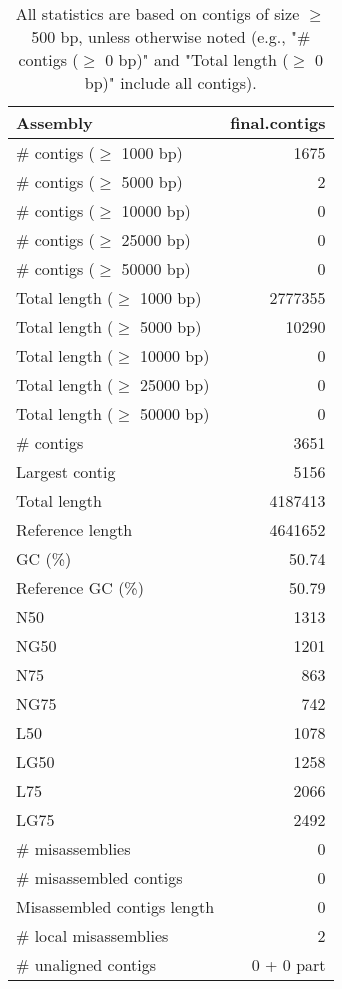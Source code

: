 \documentclass[12pt,a4paper]{article}
\begin{document}
\begin{table}[ht]
\begin{center}
\caption{All statistics are based on contigs of size $\geq$ 500 bp, unless otherwise noted (e.g., "\# contigs ($\geq$ 0 bp)" and "Total length ($\geq$ 0 bp)" include all contigs).}
\begin{tabular}{|l*{1}{|r}|}
\hline
Assembly & final.contigs \\ \hline
\# contigs ($\geq$ 1000 bp) & 1675 \\ \hline
\# contigs ($\geq$ 5000 bp) & 2 \\ \hline
\# contigs ($\geq$ 10000 bp) & 0 \\ \hline
\# contigs ($\geq$ 25000 bp) & 0 \\ \hline
\# contigs ($\geq$ 50000 bp) & 0 \\ \hline
Total length ($\geq$ 1000 bp) & 2777355 \\ \hline
Total length ($\geq$ 5000 bp) & 10290 \\ \hline
Total length ($\geq$ 10000 bp) & 0 \\ \hline
Total length ($\geq$ 25000 bp) & 0 \\ \hline
Total length ($\geq$ 50000 bp) & 0 \\ \hline
\# contigs & 3651 \\ \hline
Largest contig & 5156 \\ \hline
Total length & 4187413 \\ \hline
Reference length & 4641652 \\ \hline
GC (\%) & 50.74 \\ \hline
Reference GC (\%) & 50.79 \\ \hline
N50 & 1313 \\ \hline
NG50 & 1201 \\ \hline
N75 & 863 \\ \hline
NG75 & 742 \\ \hline
L50 & 1078 \\ \hline
LG50 & 1258 \\ \hline
L75 & 2066 \\ \hline
LG75 & 2492 \\ \hline
\# misassemblies & 0 \\ \hline
\# misassembled contigs & 0 \\ \hline
Misassembled contigs length & 0 \\ \hline
\# local misassemblies & 2 \\ \hline
\# unaligned contigs & 0 + 0 part \\ \hline

\end{tabular}
\end{center}
\end{table}
\end{document}
